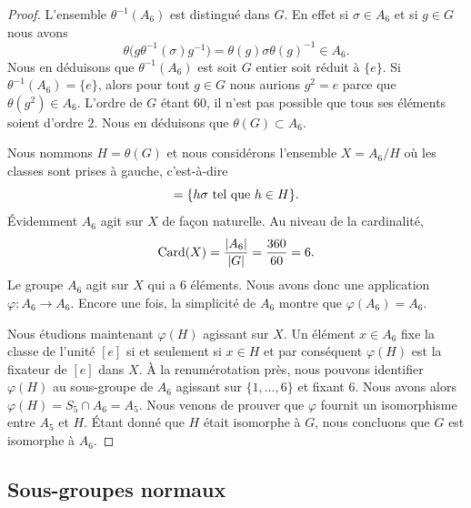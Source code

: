\begin{proof}
    L'ensemble \( \theta^{-1}(A_6)\) est distingué dans \( G\). En effet si \( \sigma\in A_6\) et si \( g\in G\) nous avons
    \begin{equation}
        \theta\big( g\theta^{-1}(\sigma)g^{-1} \big)=\theta(g)\sigma \theta(g)^{-1}\in A_6.
    \end{equation}
    Nous en déduisons que \( \theta^{-1}(A_6)\) est soit \( G\) entier soit réduit à \( \{ e \}\). Si \( \theta^{-1}(A_6)=\{ e \}\), alors pour tout \( g\in G\) nous aurions \( g^2=e\) parce que \( \theta(g^2)\in A_6\). L'ordre de \( G\) étant \( 60\), il n'est pas possible que tous ses éléments soient d'ordre \( 2\). Nous en déduisons que \( \theta(G)\subset A_6\).

    Nous nommons \( H=\theta(G)\) et nous considérons l'ensemble \( X=A_6/H\) où les classes sont prises à gauche, c'est-à-dire
    \begin{equation}
        [\sigma]=\{ h\sigma\tq h\in H \}.
    \end{equation}
    Évidemment \( A_6\) agit sur \( X\) de façon naturelle. Au niveau de la cardinalité,
    \begin{equation}
        \operatorname{Card}(X)=\frac{ | A_6 | }{ | G | }=\frac{ 360 }{ 60 }=6.
    \end{equation}
    Le groupe \( A_6\) agit sur \( X\) qui a \( 6\) éléments. Nous avons donc une application \( \varphi\colon A_6\to A_6\). Encore une fois, la simplicité de \( A_6\) montre que \( \varphi(A_6)=A_6\).

    Nous étudions maintenant \( \varphi(H)\) agissant sur \( X\). Un élément \( x\in A_6\) fixe la classe de l'unité \( [e]\) si et seulement si \( x\in H\) et par conséquent \( \varphi(H)\) est la fixateur de \( [e]\) dans \( X\). À la renumérotation près, nous pouvons identifier \( \varphi(H)\) au sous-groupe de \( A_6\) agissant sur \( \{ 1,\ldots, 6 \}\) et fixant \( 6\). Nous avons alors \( \varphi(H)=S_5\cap A_6=A_5\). Nous venons de prouver que \( \varphi\) fournit un isomorphisme entre \( A_5\) et \( H\). Étant donné que \( H\) était isomorphe à \( G\), nous concluons que \( G\) est isomorphe à \( A_6\).
\end{proof}

\subsection{Sous-groupes normaux}

